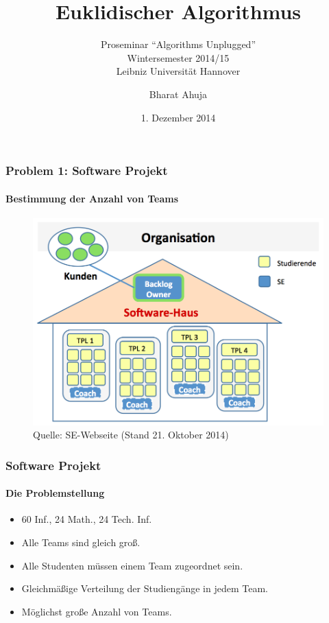 \documentclass[•]{beamer}
\title{Euklidischer Algorithmus}
\subtitle{Proseminar ``Algorithms Unplugged''\\
Wintersemester 2014/15\\ 
Leibniz Universit\"at Hannover}
\date{1. Dezember 2014}
\author{Bharat Ahuja}
\begin{document}
\maketitle


\begin{frame}
	\frametitle{Problem 1: Software Projekt}
	\framesubtitle{Bestimmung der Anzahl von Teams}
	
	\begin{figure}
	\centering
	\includegraphics[scale=0.20]{Organisation}
	\caption*{\scriptsize{Quelle: SE-Webseite (Stand 21. Oktober 2014)}}
	\end{figure}
	
\end{frame}
	
	
\begin{frame}
	\frametitle{Software Projekt}
	\framesubtitle{Die Problemstellung}
	\begin{itemize}
		\item 60 Inf., 24 Math., 24 Tech. Inf.
		\item Alle Teams sind gleich gro{\ss}.
		\item Alle Studenten m\"ussen einem Team zugeordnet sein.
		\item Gleichm\"a{\ss}ige Verteilung der Studieng\"ange in jedem Team.
		\item M\"oglichst gro{\ss}e Anzahl von Teams.
		\end{itemize}
\end{frame}
\end{document}

